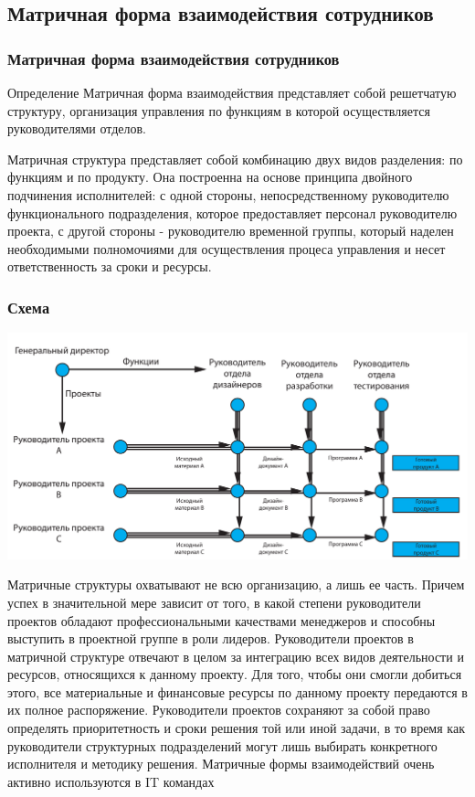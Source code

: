 \documentclass{../industrial-development}
\begin{document}
\subsection{Матричная форма взаимодействия сотрудников}

\begin{frame} \frametitle{Матричная форма взаимодействия сотрудников}
  \begin{block}{Определение}
	Матричная форма взаимодействия представляет собой решетчатую структуру, организация управления по функциям в которой осуществляется руководителями отделов.
  \end{block}
\end{frame}

\lecturenotes
Матричная структура представляет собой комбинацию двух видов разделения: по функциям и по продукту. Она построенна на основе принципа двойного подчинения исполнителей: с одной стороны, непосредственному руководителю функционального подразделения, которое предоставляет персонал руководителю проекта, с другой стороны  - руководителю временной группы, который наделен необходимыми полномочиями для осуществления процеса управления и несет ответственность за сроки и ресурсы.

\begin{frame} \frametitle{Схема}

\centerline{\includegraphics[width=1\textwidth]{matrix.pdf}}

\end{frame}

\lecturenotes
Матричные структуры охватывают не всю организацию, а лишь ее часть. Причем успех в значительной мере зависит от того, в какой степени руководители проектов обладают профессиональными качествами менеджеров и способны выступить в проектной группе в роли лидеров.
Руководители проектов в матричной структуре отвечают в целом за интеграцию всех видов деятельности и ресурсов, относящихся к данному проекту. Для того, чтобы они смогли добиться этого, все материальные и финансовые ресурсы по данному проекту передаются в их полное распоряжение. Руководители проектов сохраняют за собой право определять приоритетность и сроки решения той или иной задачи, в то время как руководители структурных подразделений могут лишь выбирать конкретного исполнителя и методику решения.
Матричные формы взаимодействий очень активно используются в IT  командах
\end{document}
